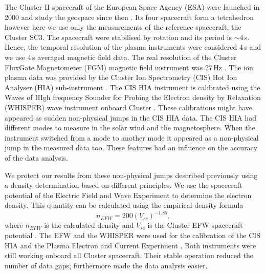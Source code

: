 \documentclass[linenumbers,draft]{agujournal}
\begin{document}
The Cluster-II spacecraft of the European Space Agency (ESA) were launched in 2000 and study the geospace since then \citep{credland97:_clust_mission,escoubet01:_introd_clust}. Its four spacecraft form a tetrahedron however here we use only the measurements of the reference spacecraft, the Cluster SC3. The spacecraft were stabilised by rotation and its period is $\sim$4\,s. Hence, the temporal resolution of the plasma instruments were considered 4\,s and we use 4\,s averaged magnetic field data. The real resolution of the Cluster FluxGate Magnetometer (FGM) magnetic field instrument was 27\,Hz \citep{balogh97:_clust_magnet_field_inves,balogh01:_clust_magnet_field_inves}. The ion plasma data was provided by the Cluster Ion Spectrometry (CIS) Hot Ion Analyser (HIA) sub-instrument \citep{reme97:_clust_ion_spect_exper,reme01:_first_earth_clust_cis}. The CIS HIA instrument is calibrated using the Waves of HIgh frequency Sounder for Probing the Electron density by Relaxation (WHISPER) wave instrument onboard Cluster \citep{decreau01:_early_whisp_clust,trotignon10:_whisp_relax_sound_clust_activ_archiv,blagau13:_in_hot_ion_analy_clust,blagau14:_in_hot_ion_analy_clust}. These calibrations might have appeared as sudden non-physical jumps in the CIS HIA data. The CIS HIA had different modes to measure in the solar wind and the magnetosphere. When the instrument switched from a mode to another mode it appeared as a non-physical jump in the measured data too. These features had an influence on the accuracy of the data analysis.

We protect our results from these non-physical jumps described previously using a density determination based on different principles. We use the spacecraft potential of the Electric Field and Wave Experiment \citep[EFW ;][]{gustafsson97:_elect_field_wave_exper_clust_mission,gustafsson01:_first_clust_efw} to determine the electron density. This quantity can be calculated using the empirical density formula 
\begin{equation}\label{eq:empdens}
n_{EFW}=200(V_{sc})^{-1.85},
\end{equation}
where $n_{EFW}$ is the calculated density and $V_{sc}$ is the Cluster EFW spacecraft potential \citep{trotignon10:_whisp_relax_sound_clust_activ_archiv,trotignon11:_calib_repor_whisp_measur_clust}. The EFW and the WHISPER were used for the calibration of the CIS HIA and the Plasma Electron and Current Experiment \citep[PEACE;][]{johnstone97:_peace,fazakerley10:_peace_data_clust_activ_archiv,fazakerley10:_clust_peace_in_calib_status}. Both instruments were still working onboard all Cluster spacecraft. Their stable operation reduced the number of data gaps; furthermore made the data analysis easier.
\end{document}
